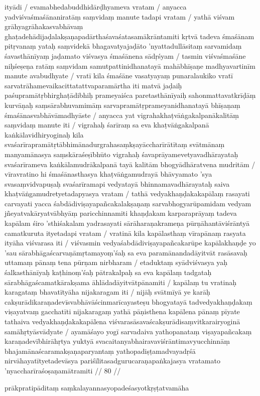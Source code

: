 ityādi  / evamabhedabuddhidārḍhyameva vratam  / anyacca yadviśvaśmaśānaniratāṃ saṃvidaṃ manute tadapi vratam  / yathā viśvam grāhyagrāhakasvabhāvaṃ ghaṭadehādijaḍalakṣaṇapadārthaśavaśatasamākrāntamiti kṛtvā tadeva śmaśānam pitṛvanaṃ yataḥ saṃvidekā bhagavatyajaḍāto 'nyattadullāsitaṃ sarvamidaṃ śavasthānīyaṃ jaḍamato viśvasya śmaśānena sādṛśyam  / tasmin viśvaśmaśāne niḥśeṣeṇa ratāṃ saṃvidam samutpattinidhanatayā mahābhīṣaṇe madhyavartinīm manute avabudhyate  / vratī kila śmaśāne vasatyayaṃ punaralaukiko vratī sarvatrāhamevaikacittatattvaparamārtha iti matvā jaḍaiḥ paśupramātṛbhirghaṭādibhiḥ prameyaiśca paretasthānīyaiḥ sahonmattavatkrīḍāṃ kurvāṇaḥ saṃsārabhuvamimāṃ sarvapramātṛprameyanidhanatayā bhīṣaṇaṃ śmaśānasvabhāvāmadhyāste  / anyacca yat vigrahakhaṭvāṅgakalpanākalitāṃ saṃvidaṃ manute iti  / vigrahaḥ śarīraṃ sa eva khaṭvāṅgakalpanā kaṅkālavidhiryoginaḥ kila svaśarīrapramātṛtābhimānadurgrahasaṃkṣayāccharīrātītaṃ svātmānaṃ manyamānasya saṃskāraśeṣībhūto vigrahaḥ śavaprāyamevetyavadhārayataḥ svaśarīrameva kaṅkālamudrākalpanā tayā kalitām bhogyādhāratvena mudritām  / vīravratino hi śmaśānasthasya khaṭvāṅgamudrayā bhāvyamato 'sya svasaṃvidvapuṣaḥ svaśarīramapi vedyatayā bhinnamavadhārayataḥ saiva khaṭvāṅgamudretyetadapyasya vratam  / tathā vedyakhaṇḍakakapālaṃ rasayati carvayati yacca śabdādiviṣayapañcakalakṣaṇaṃ sarvabhogyarūpamidam vedyam jñeyatvakāryatvābhyāṃ paricchinnamiti khaṇḍakam karparaprāyaṃ tadeva kapālam śiro 'sthiśakalam yadrasayati sārāharaṇakrameṇa pūrṇāhantāviśrāntyā camatkuruta ityetadapi vratam  / vratinā kila kapālasthaṃ vīrapānaṃ rasyata ityāha viśvarasa iti  / viśvasmin vedyaśabdādiviṣayapañcakarūpe kapālakhaṇḍe yo 'sau sārabhāgaścarvaṇāmṛtamayoṃ'śaḥ sa eva paramānandadāyitvāt rasāsavaḥ uttamaṃ pānaṃ
tena pūrṇam nirbharam  / etaduktaṃ syādviśvasya yaḥ śalkasthānīyaḥ kaṭhinoṃ'śaḥ pātrakalpaḥ sa eva kapālaṃ tadgataḥ sārabhāgaścamatkārakṣama āhlādadāyitvātpānamiti  / kapālaṃ tu vratinaḥ karagataṃ bhavatītyāha nijakaragam iti  / nijāḥ svātmīyā ye karāḥ cakṣurādikaraṇadevīsvabhāvāścinmarīcayasteṣu bhogyatayā tadvedyakhaṇḍakaṃ viṣayatvaṃ gacchatīti nijakaragaṃ yathā pāṇisthena kapālena pānaṃ pīyate tathaiva vedyakhaṇḍakakapālena viśvarasāsavaścakṣurādisaṃvitkarairyoginā samāhṛtyāsvādyate  / ayamāśayo yogī sarvadaiva yathopanataṃ viṣayapañcakaṃ karaṇadevībhirāhṛtya yuktyā svacaitanyabhairavaviśrāntimavyucchinnāṃ bhajamānaścaramakṣaṇaparyantaṃ yathopadiṣṭamadvayadṛśā nirvāhayatītyetadevāsya pariśīlitasadgurucaraṇapaṅkajasya vratamato 'nyaccharīraśoṣaṇamātramiti  // 80  //

prākpratipāditaṃ saṃkalayannasyopadeśasyotkṛṣṭatvamāha

